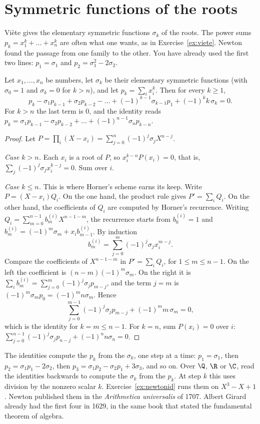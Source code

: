 \section{Symmetric functions of the roots}\label{sec:symmetric}

Vi\`ete gives the elementary symmetric functions $\sigma_k$ of the roots. The power sums $p_k=x_1^k+\dots+x_n^k$ are often what one wants, as in Exercise~\ref{ex:viete}. Newton found the passage from one family to the other. You have already used the first two lines: $p_1=\sigma_1$ and $p_2=\sigma_1^2-2\sigma_2$.

\begin{proposition}\label{prop:newtonid}
Let $x_1,\dots,x_n$ be numbers, let $\sigma_k$ be their elementary symmetric functions (with $\sigma_0=1$ and $\sigma_k=0$ for $k>n$), and let $p_k=\sum_ix_i^k$. Then for every $k\ge1$,
\[
p_k-\sigma_1p_{k-1}+\sigma_2p_{k-2}-\dots+(-1)^{k-1}\sigma_{k-1}p_1+(-1)^kk\,\sigma_k=0.
\]
For $k>n$ the last term is $0$, and the identity reads $p_k=\sigma_1p_{k-1}-\sigma_2p_{k-2}+\dots+(-1)^{n-1}\sigma_np_{k-n}$.
\end{proposition}
\begin{proof}
Let $P=\prod_i(X-x_i)=\sum_{j=0}^n(-1)^j\sigma_jX^{n-j}$.

\emph{Case $k>n$.} Each $x_i$ is a root of $P$, so $x_i^{k-n}P(x_i)=0$, that is, $\sum_j(-1)^j\sigma_jx_i^{k-j}=0$. Sum over $i$.

\emph{Case $k\le n$.} This is where Horner's scheme earns its keep. Write $P=(X-x_i)Q_i$. On the one hand, the product rule gives $P'=\sum_iQ_i$. On the other hand, the coefficients of $Q_i$ are computed by Horner's recurrence. Writing $Q_i=\sum_{m=0}^{n-1}b_m^{(i)}X^{n-1-m}$, the recurrence starts from $b_0^{(i)}=1$ and $b_m^{(i)}=(-1)^m\sigma_m+x_ib_{m-1}^{(i)}$. By induction
\[
b_m^{(i)}=\sum_{j=0}^m(-1)^j\sigma_jx_i^{m-j}.
\]
Compare the coefficients of $X^{n-1-m}$ in $P'=\sum_iQ_i$, for $1\le m\le n-1$. On the left the coefficient is $(n-m)(-1)^m\sigma_m$. On the right it is $\sum_ib_m^{(i)}=\sum_{j=0}^m(-1)^j\sigma_jp_{m-j}$, and the term $j=m$ is $(-1)^m\sigma_mp_0=(-1)^mn\sigma_m$. Hence
\[
\sum_{j=0}^{m-1}(-1)^j\sigma_jp_{m-j}+(-1)^mm\,\sigma_m=0,
\]
which is the identity for $k=m\le n-1$. For $k=n$, sum $P(x_i)=0$ over $i$: $\sum_{j=0}^{n-1}(-1)^j\sigma_jp_{n-j}+(-1)^nn\sigma_n=0$.
\end{proof}

The identities compute the $p_k$ from the $\sigma_k$, one step at a time: $p_1=\sigma_1$, then $p_2=\sigma_1p_1-2\sigma_2$, then $p_3=\sigma_1p_2-\sigma_2p_1+3\sigma_3$, and so on. Over $\Q$, $\R$ or $\C$, read the identities backwards to compute the $\sigma_k$ from the $p_k$. At step $k$ this uses division by the nonzero scalar $k$. Exercise~\ref{ex:newtonid} runs them on $X^3-X+1$. Newton published them in the \emph{Arithmetica universalis} of 1707. Albert Girard already had the first four in 1629, in the same book that stated the fundamental theorem of algebra.

